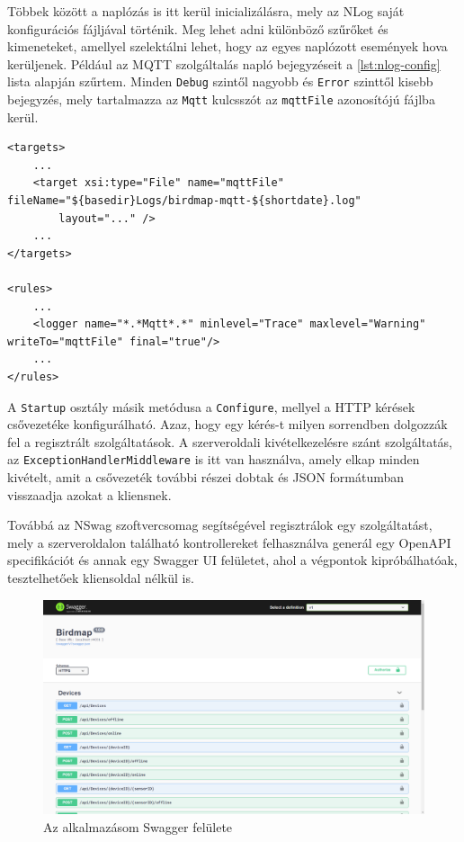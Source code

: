 Többek között a naplózás is itt kerül inicializálásra, mely az NLog saját konfigurációs fájljával történik.
Meg lehet adni különböző szűrőket és kimeneteket, amellyel szelektálni lehet, hogy az egyes naplózott események hova kerüljenek.
Például az MQTT szolgáltalás napló bejegyzéseit a \ref{lst:nlog-config} lista alapján szűrtem.
Minden \verb+Debug+ szintől nagyobb és \verb+Error+ szinttől kisebb bejegyzés, mely tartalmazza az \verb+Mqtt+ kulcsszót az \verb+mqttFile+ azonosítójú fájlba kerül.

\begin{lstlisting}[caption=Az NLog.config fájl egy részlete, label=lst:nlog-config]
<targets>
    ...
    <target xsi:type="File" name="mqttFile" fileName="${basedir}Logs/birdmap-mqtt-${shortdate}.log"
        layout="..." />
    ...
</targets>

<rules>
    ...
    <logger name="*.*Mqtt*.*" minlevel="Trace" maxlevel="Warning" writeTo="mqttFile" final="true"/>
    ...
</rules>
\end{lstlisting}

A \verb+Startup+ osztály másik metódusa a \verb+Configure+, mellyel a HTTP kérések csővezetéke konfigurálható.
Azaz, hogy egy kérés-t milyen sorrendben dolgozzák fel a regisztrált szolgáltatások.
A szerveroldali kivételkezelésre szánt szolgáltatás, az \verb+ExceptionHandlerMiddleware+ is itt van használva, 
amely elkap minden kivételt, amit a csővezeték további részei dobtak és JSON formátumban visszaadja azokat a kliensnek.

Továbbá az NSwag\cite{nswag} szoftvercsomag segítségével regisztrálok egy szolgáltatást, 
mely a szerveroldalon található kontrollereket felhasználva generál egy OpenAPI specifikációt és annak egy Swagger UI\cite{swagger-ui} felületet,
ahol a végpontok kipróbálhatóak, tesztelhetőek kliensoldal nélkül is.

\begin{figure}[!ht]
    \centering
    \includegraphics[width=150mm, keepaspectratio]{figures/swagger-ui.png}
    \caption{Az alkalmazásom Swagger felülete}
    \label{fig:swagger-ui}
\end{figure}

